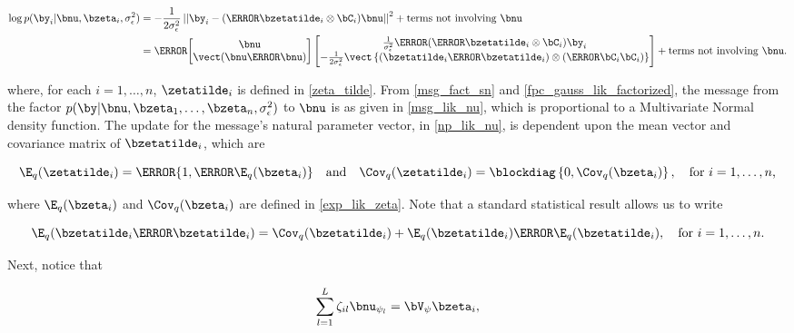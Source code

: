 \documentclass[12pt]{article}
\def\sigsqeps{\sigma^2_{\epsilon}}
\def\Vpsi{\bV_\psi}
\newcommand\nupsi[1]{\bnu_{\psi_{#1}}}
\newcommand\tni[1]{\text{terms not involving $#1$}}
\theoremstyle{plain}
\theoremstyle{definition}
\theoremstyle{remark}
\begin{document}
\begin{align*}
	\log p (\by_i | \bnu, \bzeta_i, \sigsqeps)
		& = -\frac{1}{2\sigsqeps} \left|\left|
			\by_i - (\T{\bzetatilde_i} \otimes \bC_i) \bnu
		\right|\right|^2 + \tni{\bnu} \\
		& = \T{\begin{bmatrix}
			\bnu \\
			\vect (\bnu \T{\bnu})
		\end{bmatrix}} \begin{bmatrix}
			\frac{1}{\sigsqeps} \T{(\T{\bzetatilde_i} \otimes \bC_i)} \by_i \\
			-\frac{1}{2\sigsqeps} \vect \left\{
				(\bzetatilde_i \T{\bzetatilde_i}) \otimes (\T{\bC_i} \bC_i)
			\right\}
		\end{bmatrix} + \tni{\bnu}.
\end{align*}

\noindent where, for each $i = 1, \dots, n$, $\zetatilde_i$ is defined in \eqref{zeta_tilde}.
From \eqref{msg_fact_sn} and \eqref{fpc_gauss_lik_factorized}, the message from the factor $p (\by | \bnu,
\bzeta_1, \dots, \bzeta_n, \sigsqeps)$ to $\bnu$ is as given in \eqref{msg_lik_nu}, which is proportional to a
Multivariate Normal density function. The update for the message's natural parameter vector,
in \eqref{np_lik_nu}, is dependent upon
the mean vector and covariance matrix of $\bzetatilde_i$, which are

\begin{equation}
	\E_q (\zetatilde_i) = \T{\{ 1, \T{\E_q (\bzeta_i)} \}} \quad
	\text{and} \quad
	\Cov_q (\zetatilde_i) = \blockdiag \left\{ 0, \Cov_q (\bzeta_i) \right\}, \quad
	\text{for $i = 1, \dots, n$,}
\label{exp_lik_zeta_tilde}
\end{equation}

\noindent where $\E_q (\bzeta_i)$ and $\Cov_q (\bzeta_i)$ are defined in \eqref{exp_lik_zeta}. Note that
a standard statistical result allows us to write

\begin{equation}
	\E_q (\bzetatilde_i \T{\bzetatilde_i}) =
		\Cov_q (\bzetatilde_i) + \E_q (\bzetatilde_i) \T{\E_q (\bzetatilde_i)}, \quad \text{for $i = 1, \dots, n$.}
\label{E_q_outer_zeta}
\end{equation}

Next, notice that

\begin{equation}
	\sum_{l=1}^L \zeta_{il} \nupsi{l} = \Vpsi \bzeta_i,
\label{zeta_simplification}
\end{equation}
\end{document}
